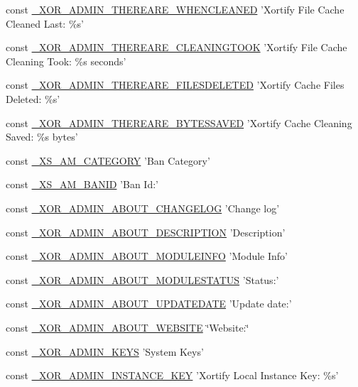 \begin{DoxyCompactItemize}
$$\item 
const \hyperlink{admin_8php_afae007156879341ae852ea2a072f6573}{\-\_\-\-X\-O\-R\-\_\-\-A\-D\-M\-I\-N\-\_\-\-T\-H\-E\-R\-E\-A\-R\-E\-\_\-\-W\-H\-E\-N\-C\-L\-E\-A\-N\-E\-D} 'Xortify File Cache Cleaned Last\-: \%s'
\item 
const \hyperlink{admin_8php_a8b6262b7d13c7fa83c5d50f1dec7ac5a}{\-\_\-\-X\-O\-R\-\_\-\-A\-D\-M\-I\-N\-\_\-\-T\-H\-E\-R\-E\-A\-R\-E\-\_\-\-C\-L\-E\-A\-N\-I\-N\-G\-T\-O\-O\-K} 'Xortify File Cache Cleaning Took\-: \%s seconds'
\item 
const \hyperlink{admin_8php_ad3cc152f725c9a18bf2ee09448d7203b}{\-\_\-\-X\-O\-R\-\_\-\-A\-D\-M\-I\-N\-\_\-\-T\-H\-E\-R\-E\-A\-R\-E\-\_\-\-F\-I\-L\-E\-S\-D\-E\-L\-E\-T\-E\-D} 'Xortify Cache Files Deleted\-: \%s'
\item 
const \hyperlink{admin_8php_ac4586fb8fcffface0612692b5d8259cd}{\-\_\-\-X\-O\-R\-\_\-\-A\-D\-M\-I\-N\-\_\-\-T\-H\-E\-R\-E\-A\-R\-E\-\_\-\-B\-Y\-T\-E\-S\-S\-A\-V\-E\-D} 'Xortify Cache Cleaning Saved\-: \%s bytes'
\item 
const \hyperlink{admin_8php_a85b6051b1853dd7323a316a0a7be10fd}{\-\_\-\-X\-S\-\_\-\-A\-M\-\_\-\-C\-A\-T\-E\-G\-O\-R\-Y} 'Ban Category'
\item 
const \hyperlink{admin_8php_abd1dbb1388e056d25293fdc206f6ee92}{\-\_\-\-X\-S\-\_\-\-A\-M\-\_\-\-B\-A\-N\-I\-D} 'Ban Id\-:'
\item 
const \hyperlink{admin_8php_afa25ff7c50ae2b3fd766e59f4a375e95}{\-\_\-\-X\-O\-R\-\_\-\-A\-D\-M\-I\-N\-\_\-\-A\-B\-O\-U\-T\-\_\-\-C\-H\-A\-N\-G\-E\-L\-O\-G} 'Change log'
\item 
const \hyperlink{admin_8php_a3d015b333671cf464dd6ef55ca897bf1}{\-\_\-\-X\-O\-R\-\_\-\-A\-D\-M\-I\-N\-\_\-\-A\-B\-O\-U\-T\-\_\-\-D\-E\-S\-C\-R\-I\-P\-T\-I\-O\-N} 'Description'
\item 
const \hyperlink{admin_8php_ad508ca7cdcc22950a35c5dc032cb0b07}{\-\_\-\-X\-O\-R\-\_\-\-A\-D\-M\-I\-N\-\_\-\-A\-B\-O\-U\-T\-\_\-\-M\-O\-D\-U\-L\-E\-I\-N\-F\-O} 'Module Info'
\item 
const \hyperlink{admin_8php_a99aae1a62e59e926e039093886ff9290}{\-\_\-\-X\-O\-R\-\_\-\-A\-D\-M\-I\-N\-\_\-\-A\-B\-O\-U\-T\-\_\-\-M\-O\-D\-U\-L\-E\-S\-T\-A\-T\-U\-S} 'Status\-:'
\item 
const \hyperlink{admin_8php_a1bf19049af979a44f07e388459118f05}{\-\_\-\-X\-O\-R\-\_\-\-A\-D\-M\-I\-N\-\_\-\-A\-B\-O\-U\-T\-\_\-\-U\-P\-D\-A\-T\-E\-D\-A\-T\-E} 'Update date\-:'
\item 
const \hyperlink{admin_8php_a7e5249444e39a7b104452f7cae4b9d74}{\-\_\-\-X\-O\-R\-\_\-\-A\-D\-M\-I\-N\-\_\-\-A\-B\-O\-U\-T\-\_\-\-W\-E\-B\-S\-I\-T\-E} \char`\"{}Website\-:\char`\"{}
\item 
const \hyperlink{admin_8php_abf4f547c45ab804d5a4262e77be36527}{\-\_\-\-X\-O\-R\-\_\-\-A\-D\-M\-I\-N\-\_\-\-K\-E\-Y\-S} 'System Keys'
\item 
const \hyperlink{admin_8php_ac038d8fcb468ed8c2fa318b04d9a575e}{\-\_\-\-X\-O\-R\-\_\-\-A\-D\-M\-I\-N\-\_\-\-I\-N\-S\-T\-A\-N\-C\-E\-\_\-\-K\-E\-Y} 'Xortify Local Instance Key\-: \%s'
\end{DoxyCompactItemize}



